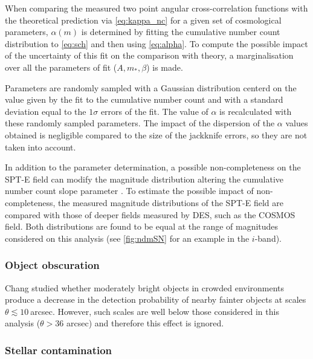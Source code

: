 	When comparing the measured two point angular cross-correlation functions with the theoretical prediction via \autoref{eq:kappa_nc} for a given set of cosmological parameters, $\alpha(m)$ is determined by fitting the cumulative number count distribution to \autoref{eq:sch} and then using \autoref{eq:alpha}. To compute the possible impact of the uncertainty of this fit on the comparison with theory, a marginalisation over all the parameters of fit ($A,m_*,\beta$) is made.
\newline
	
Parameters are randomly sampled with a Gaussian distribution centerd on the value given by the fit to the cumulative number count and with a standard deviation equal to the $1\sigma$ errors of the fit. The value of $\alpha$ is recalculated with these randomly sampled parameters. The impact of the dispersion of the $\alpha$ values obtained is negligible compared to the size of the jackknife errors, so they are not taken into account.
\newline

In addition to the parameter determination, a possible non-completeness on the SPT-E field can modify the magnitude distribution altering the cumulative number count slope parameter \cite{2016MNRAS.455.3943H}. To estimate the possible impact of non-completeness, the measured magnitude distributions of the SPT-E field are compared with those of deeper fields measured by DES, such as the COSMOS field. Both distributions are found to be equal at the range of magnitudes considered on this analysis (see \autoref{fig:ndmSN} for an example in the $i$-band).

\subsubsection{Object obscuration}

Chang \cite{0004-637X-801-2-73} studied whether moderately bright objects in crowded environments produce a decrease in the detection probability of nearby fainter objects at scales $\theta\lesssim10\ $arcsec. However, such scales are well below those considered in this analysis ($\theta>36$ arcsec) and therefore this effect is ignored.

\subsubsection{Stellar contamination}
    

